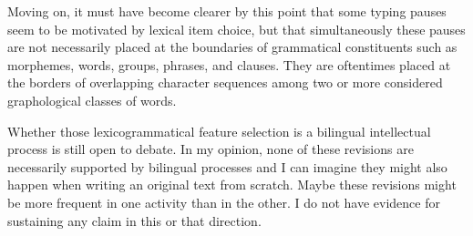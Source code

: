 Moving on, it must have become clearer by this point that some typing pauses seem to be motivated by lexical item choice, but that simultaneously these pauses are not necessarily placed at the boundaries of grammatical constituents such as morphemes, words, groups, phrases, and clauses. They are oftentimes placed at the borders of overlapping character sequences among two or more considered graphological classes of words.

Whether those lexicogrammatical feature selection is a bilingual intellectual process is still open to debate. In my opinion, none of these revisions are necessarily supported by bilingual processes and I can imagine they might also happen when writing an original text from scratch. Maybe these revisions might be more frequent in one activity than in the other. I do not have evidence for sustaining any claim in this or that direction.